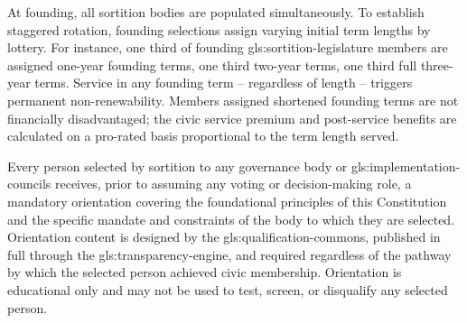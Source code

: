 At founding, all sortition bodies are populated simultaneously. To establish staggered rotation, founding selections assign varying initial term lengths by lottery. For instance, one third of founding \gls{gls:sortition-legislature} members are assigned one-year founding terms, one third two-year terms, one third full three-year terms. Service in any founding term -- regardless of length -- triggers permanent non-renewability. Members assigned shortened founding terms are not financially disadvantaged; the civic service premium and post-service benefits are calculated on a pro-rated basis proportional to the term length served.

Every person selected by sortition to any governance body or \gls{gls:implementation-councils} receives, prior to assuming any voting or decision-making role, a mandatory orientation covering the foundational principles of this Constitution and the specific mandate and constraints of the body to which they are selected. Orientation content is designed by the \gls{gls:qualification-commons}, published in full through the \gls{gls:transparency-engine}, and required regardless of the pathway by which the selected person achieved civic membership. Orientation is educational only and may not be used to test, screen, or disqualify any selected person.